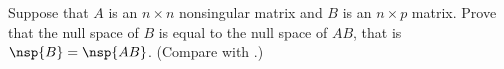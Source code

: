 Suppose that $A$ is an $n\times n$ nonsingular matrix and $B$ is an $n\times p$ matrix.  Prove that the null space of $B$ is equal to the null space of $AB$, that is $\nsp{B}=\nsp{AB}$.  (Compare with .)